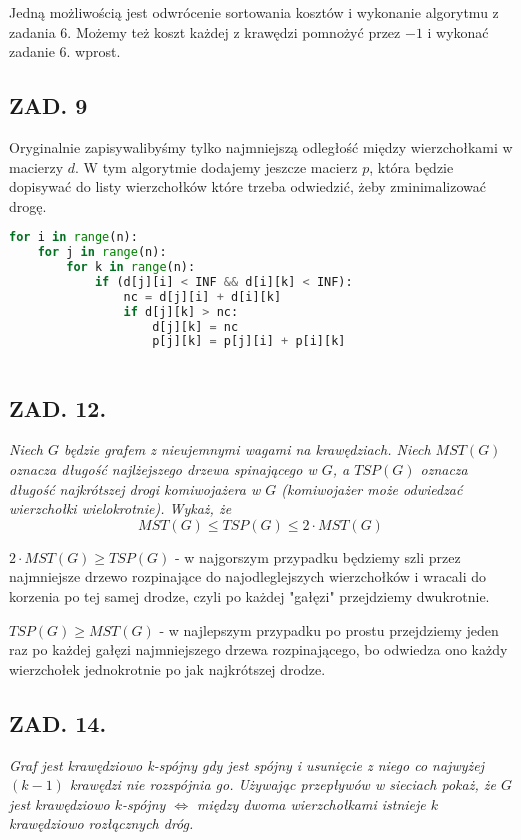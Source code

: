 \documentclass{article}
\begin{document}
\medskip

Jedną możliwością jest odwrócenie sortowania kosztów i wykonanie algorytmu z zadania 6. Możemy też koszt każdej z krawędzi pomnożyć przez $-1$ i wykonać zadanie 6. wprost.

    \subsection*{ZAD. 9}

    Oryginalnie zapisywalibyśmy tylko najmniejszą odległość między wierzchołkami w macierzy $d$. W tym algorytmie dodajemy jeszcze macierz $p$, która będzie dopisywać do listy wierzchołków które trzeba odwiedzić, żeby zminimalizować drogę.

\begin{lstlisting}[language=Python]
for i in range(n):
    for j in range(n):
        for k in range(n):
            if (d[j][i] < INF && d[i][k] < INF):
                nc = d[j][i] + d[i][k]
                if d[j][k] > nc:
                    d[j][k] = nc 
                    p[j][k] = p[j][i] + p[i][k]
            
\end{lstlisting}

\subsection*{ZAD. 12.}
\emph{Niech $G$ będzie grafem z nieujemnymi wagami na krawędziach. Niech $MST(G)$ oznacza długość najlżejszego drzewa spinającego w $G$, a $TSP(G)$ oznacza długość najkrótszej drogi komiwojażera w $G$ (komiwojażer może odwiedzać wierzchołki wielokrotnie). Wykaż, że}
$$MST(G)\leq TSP(G)\leq 2\cdot MST(G)$$
\medskip

$2\cdot MST(G)\geq TSP(G)$ - w najgorszym przypadku będziemy szli przez najmniejsze drzewo rozpinające do najodleglejszych wierzchołków i wracali do korzenia po tej samej drodze, czyli po każdej "gałęzi" przejdziemy dwukrotnie.
\smallskip

$TSP(G)\geq MST(G)$ - w najlepszym przypadku po prostu przejdziemy jeden raz po każdej gałęzi najmniejszego drzewa rozpinającego, bo odwiedza ono każdy wierzchołek jednokrotnie po jak najkrótszej drodze.

\subsection*{ZAD. 14.}
\emph{Graf jest krawędziowo k-spójny gdy jest spójny i usunięcie z niego co najwyżej $(k-1)$ krawędzi nie rozspójnia go. Używając przepływów w sieciach pokaż, że $G$ jest krawędziowo $k$-spójny $\iff$ między dwoma wierzchołkami istnieje $k$ krawędziowo rozłącznych dróg.}
\medskip
\end{document}
